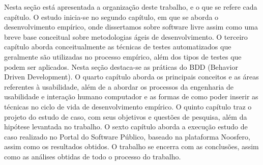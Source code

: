 Nesta seção está apresentada a organização deste trabalho, e o que se refere cada capítulo.
%
O estudo inicia-se no segundo capítulo, em que se aborda o desenvolvimento empírico, onde dissertamos sobre software livre assim como uma breve base conceitual sobre metodologias ágeis de desenvolvimento.
%
O terceiro capítulo aborda conceitualmente as técnicas de testes automatizados que geralmente são utilizadas no processo empírico, além dos tipos de testes que podem ser aplicados. Nesta seção destaca-se as práticas do BDD (Behavior Driven Development).
%
O quarto capítulo aborda os principais conceitos e as áreas referentes à usabilidade, além de a abordar os processos da engenharia de usabilidade e interação humano computador e as formas de como poder inserir as técnicas no ciclo de vida de desenvolvimento empírico.
%
O quinto capítulo traz o projeto do estudo de caso, com seus objetivos e questões de pesquisa, além da hipótese levantada no trabalho.
%
O sexto capítulo aborda a execução estudo de caso realizado no Portal do Software Público, baseado na plataforma Noosfero, assim como os resultados obtidos.
%
O trabalho se encerra com as conclusões, assim como as análises obtidas de todo o processo do trabalho.



